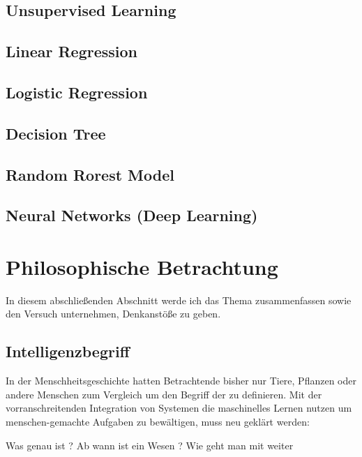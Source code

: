 \documentclass[12pt]{report}
\begin{document}
    \subsection{Unsupervised Learning}
    \subsection{Linear Regression}
    \subsection{Logistic Regression}
    \subsection{Decision Tree}
    \subsection{Random Rorest Model}
    \subsection{Neural Networks (Deep Learning)}
    \section{Philosophische Betrachtung}
    In diesem abschließenden Abschnitt werde ich das Thema zusammenfassen sowie den Versuch unternehmen,
    Denkanstöße zu geben.
    \subsection{Intelligenzbegriff}
    In der Menschheitsgeschichte hatten Betrachtende bisher nur Tiere, Pflanzen oder andere Menschen zum Vergleich
    um den Begriff der  zu definieren. Mit der vorranschreitenden Integration von Systemen die maschinelles
    Lernen nutzen um menschen-gemachte Aufgaben zu bewältigen, muss neu geklärt werden:
        \begin{displayquote}
            Was genau ist ?
            Ab wann ist ein Wesen ?
            Wie geht man mit weiter
        \end{displayquote}

    \printbibliography
\end{document}
